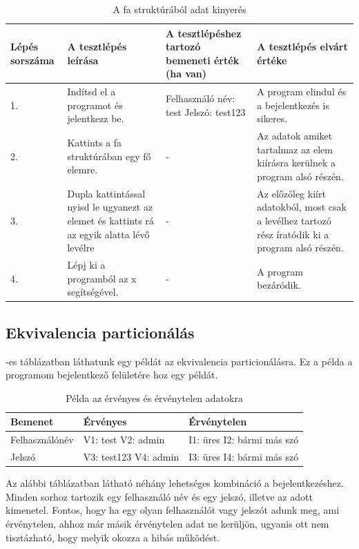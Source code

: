 \begin{table} [h]
	\begin{center}
		\resizebox{\textwidth}{!} {
			\begin{tabular}{ |p{3cm}|p{5cm}|p{5cm}|p{5cm}| } 
				\hline
				Lépés sorszáma & A tesztlépés leírása & A tesztlépéshez tartozó bemeneti érték (ha van) & A tesztlépés elvárt értéke  \\ 
				\hline
				1. & Indítsd el a programot és jelentkezz be. & Felhasználó név: test \newline Jelszó: test123 & A program elindul és a bejelentkezés is sikeres.  \\ 
				\hline
				2. & Kattints a fa struktúrában egy fő elemre. & - & Az adatok amiket tartalmaz az elem kiírásra kerülnek a program alsó részén.\\ 
				\hline
				3. & Dupla kattintással nyisd le ugyanezt az elemet és kattints rá az egyik alatta lévő levélre & - & Az előzőleg kiírt adatokból, most csak a levélhez tartozó rész íratódik ki a program alsó részén. \\
				\hline
				4. & Lépj ki a programból az x segítségével. & - & A program bezáródik. \\
				\hline
			\end{tabular}
		}
	\end{center}
	\caption{A fa struktúrából adat kinyerés}
	\label{table:jtree}
\end{table}

\subsection{Ekvivalencia particionálás} -es táblázatban láthatunk egy példát az ekvivalencia particionálásra. Ez a példa a programom bejelentkező felületére hoz egy példát.

\begin{table} [h]
	\begin{center}
		\begin{tabular}{ | p{4cm} | p{4cm}|  p{4cm} |} 
			\hline
			Bemenet & Érvényes & Érvénytelen  \\ 
			\hline
			Felhasználónév & V1: test \newline V2: admin & I1: üres \newline I2: bármi más szó  \\ 
			\hline
			Jelszó & V3: test123 \newline V4: admin & I3: üres \newline I4: bármi más szó  \\ 
			\hline
		\end{tabular}
	\end{center}
	\label{table:ekvivalencia}
	\caption{Példa az érvényes és érvénytelen adatokra}
\end{table}
\newpage
Az alábbi táblázatban látható néhány lehetséges kombináció a bejelentkezéshez. Minden sorhoz tartozik egy felhasználó név és egy jelszó, illetve az adott kimenetel. Fontos, hogy ha egy olyan felhasználót vagy jelszót adunk meg, ami érvénytelen, ahhoz már másik érvénytelen adat ne kerüljön, ugyanis ott nem tisztázható, hogy melyik okozza a hibás működést.

